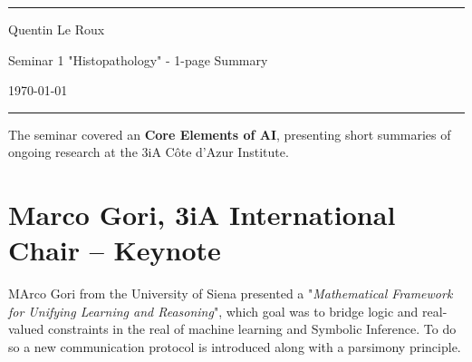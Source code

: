 \documentclass[a4paper]{article}
\begin{document}

\fancyhead[C]{}
\hrule \medskip %
\begin{minipage}{0.24\textwidth} 
\raggedright
\footnotesize
Quentin Le Roux \hfill
\end{minipage}
\begin{minipage}{0.5\textwidth} 
\centering 
\large 
Seminar 1 "Histopathology" - 1-page Summary
\end{minipage}
\begin{minipage}{0.245\textwidth} 
\raggedleft
\today
\end{minipage}
\hrule 
\bigskip


The seminar covered an \textbf{Core Elements of AI}, presenting short summaries of ongoing research at the 3iA Côte d'Azur Institute. 

\section{Marco Gori, 3iA International Chair -- Keynote}
MArco Gori from the University of Siena presented a "\textit{Mathematical Framework for Unifying Learning and Reasoning}", which goal was to bridge logic and real-valued constraints in the real of machine learning and Symbolic Inference. To do so a new communication protocol is introduced along with a parsimony principle.
\end{document}
